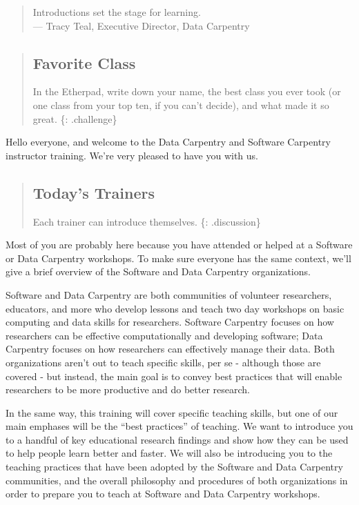 
\begin{quote}
Introductions set the stage for learning.\\--- Tracy Teal, Executive
Director, Data Carpentry
\end{quote}

\begin{quote}
\subsection{Favorite Class}\label{favorite-class}

In the Etherpad, write down your name, the best class you ever took (or
one class from your top ten, if you can't decide), and what made it so
great. \{: .challenge\}
\end{quote}

Hello everyone, and welcome to the Data Carpentry and Software Carpentry
instructor training. We're very pleased to have you with us.

\begin{quote}
\subsection{Today's Trainers}\label{todays-trainers}

Each trainer can introduce themselves. \{: .discussion\}
\end{quote}

Most of you are probably here because you have attended or helped at a
Software or Data Carpentry workshops. To make sure everyone has the same
context, we'll give a brief overview of the Software and Data Carpentry
organizations.

Software and Data Carpentry are both communities of volunteer
researchers, educators, and more who develop lessons and teach two day
workshops on basic computing and data skills for researchers. Software
Carpentry focuses on how researchers can be effective computationally
and developing software; Data Carpentry focuses on how researchers can
effectively manage their data. Both organizations aren't out to teach
specific skills, per se - although those are covered - but instead, the
main goal is to convey best practices that will enable researchers to be
more productive and do better research.

In the same way, this training will cover specific teaching skills, but
one of our main emphases will be the ``best practices'' of teaching. We
want to introduce you to a handful of key educational research findings
and show how they can be used to help people learn better and faster. We
will also be introducing you to the teaching practices that have been
adopted by the Software and Data Carpentry communities, and the overall
philosophy and procedures of both organizations in order to prepare you
to teach at Software and Data Carpentry workshops.

